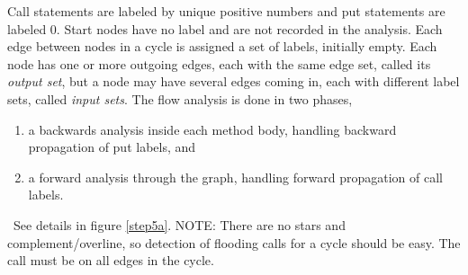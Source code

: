 \documentclass[12pt]{article}%
\begin{document}
Call statements are labeled by unique positive numbers and
put statements are labeled 0.
Start nodes have no label and are not recorded in the analysis.
Each edge between nodes in a cycle is assigned  a set of labels,
initially empty.
Each node has one or more outgoing edges, each with the same edge set,
 called its \emph{output set},
but a node may have several edges coming in, each with different label sets,
called  \emph{input sets}.
The flow analysis is done in two phases,
\begin{enumerate}
\item
a backwards analysis inside each method body, handling 
backward propagation of put labels,
 and 
\item
a forward analysis through the graph, 
handling forward propagation of call labels.
\end{enumerate}\
See details in figure \ref{step5a}.
NOTE: There are no stars and complement/overline,
so detection of flooding calls for a cycle should be easy.
The call must be on all edges in the cycle.
\end{document}
